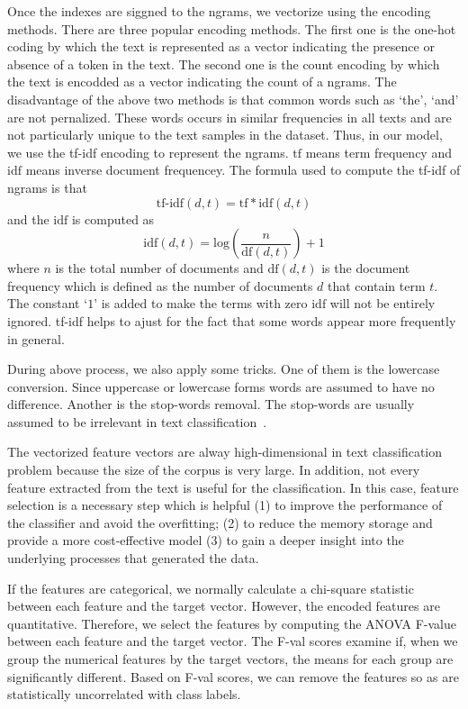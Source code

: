 Once the indexes are siggned to the ngrams, we vectorize using the encoding methods. There are three popular encoding methods. The first one is the one-hot coding by which the text is represented as a vector indicating the presence or absence of a token in the text. The second one is the count encoding by which the text is encodded as a vector indicating the count of a ngrams. The disadvantage of the above two methods is that common words such as `the', `and' are not pernalized. These words occurs in similar frequencies in all texts and are not particularly unique to the text samples in the dataset. Thus, in our model, we use the tf-idf encoding to represent the ngrams. $\mbox{tf}$ means term frequency and $\mbox{idf}$ means inverse document frequencey. The formula used to compute the tf-idf of ngrams is that
\begin{equation}
\mbox{tf-idf}(d,t) = \mbox{tf} * \mbox{idf}(d,t)
\end{equation}
and the $\mbox{idf}$ is computed as 
\begin{equation}
\mbox{idf}(d,t) = \mbox{log} (\frac{n}{\mbox{df}(d,t)}) +1
\end{equation}
where $n$ is the total number of documents and $\mbox{df}(d,t)$ is the document frequency which is defined as the number of documents $d$ that contain term $t$. The constant `$1$' is added to make the terms with zero $\mbox{idf}$ will not be entirely ignored. tf-idf helps to ajust for the fact that some words appear more frequently in general.

During above process, we also apply some tricks. One of them is the lowercase conversion. Since uppercase or lowercase forms words are assumed to have no difference. Another is the stop-words removal. The stop-words are usually assumed to be irrelevant in text classification~\cite{uysal2014impact}.

The vectorized feature vectors are alway high-dimensional in text classification problem because the size of the corpus is very large. In addition, not every feature extracted from the text is useful for the classification. In this case, feature selection is a necessary step which is helpful (1) to improve the performance of the classifier and avoid the overfitting; (2) to reduce the memory storage and provide a more cost-effective model (3) to gain a deeper insight into the underlying processes that generated the data. 

If the features are categorical, we normally calculate a chi-square statistic between each feature and the target vector. However, the encoded features are quantitative. Therefore, we select the features by computing the ANOVA F-value between each feature and the target vector. The F-val scores examine if, when we group the numerical features by the target vectors, the means for each group are significantly different. Based on F-val scores, we can remove the features so as are statistically uncorrelated with class labels.

